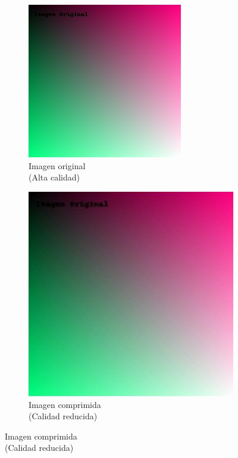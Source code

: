 \documentclass[8pt,a4paper]{article}
\theoremstyle{definition}
\theoremstyle{remark}
\begin{document}
\begin{multicols}{2}
            \begin{figure}[H]
    \centering
    \begin{subfigure}[b]{0.45\linewidth}
        \centering
        \includegraphics[width=\linewidth]{original.jpg}
        \caption{Imagen original\\(Alta calidad)}
    \end{subfigure}
    \hfill
    \begin{subfigure}[b]{0.45\linewidth}
        \centering
        \includegraphics[width=\linewidth]{comprimida.jpg}
        \caption{Imagen comprimida\\(Calidad reducida)}
    \end{subfigure}
    \captionsetup{skip=2pt}
\end{figure}


\end{multicols}
\end{document}
